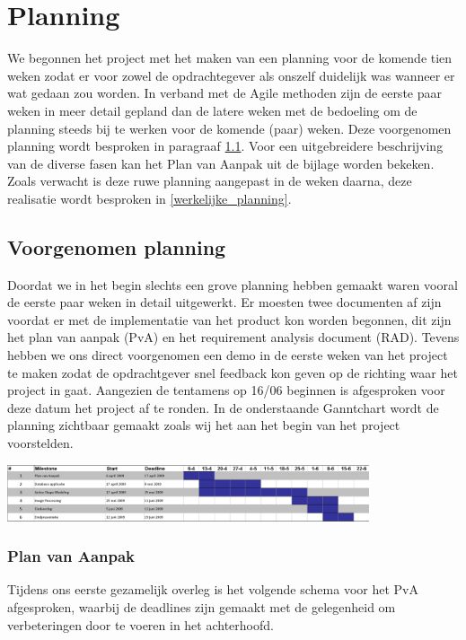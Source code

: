 \section{Planning}
\label{Planning}

We begonnen het project met het maken van een planning voor de komende tien
weken zodat er voor zowel de opdrachtegever als onszelf duidelijk was wanneer
er wat gedaan zou worden. In verband met de Agile methoden zijn de eerste paar
weken in meer detail gepland dan de latere weken met de bedoeling om de
planning steeds bij te werken voor de komende (paar) weken. Deze voorgenomen
planning wordt besproken in paragraaf \ref{voorgenomen_planning}. Voor een
uitgebreidere beschrijving van de diverse fasen kan het Plan van Aanpak uit de
bijlage worden bekeken. Zoals verwacht is deze ruwe planning aangepast in de
weken daarna, deze realisatie wordt besproken in \ref{werkelijke_planning}.

\subsection{Voorgenomen planning}
\label{voorgenomen_planning}

Doordat we in het begin slechts een grove planning hebben gemaakt waren vooral
de eerste paar weken in detail uitgewerkt. Er moesten twee documenten af zijn
voordat er met de implementatie van het product kon worden begonnen, dit zijn
het plan van aanpak (PvA) en het requirement analysis document (RAD). Tevens
hebben we ons direct voorgenomen een demo in de eerste weken van het project te
maken zodat de opdrachtgever snel feedback kon geven op de richting waar het
project in gaat.
Aangezien de tentamens op 16/06 beginnen is afgesproken
voor deze datum het project af te ronden. In de onderstaande Ganntchart wordt
de planning zichtbaar gemaakt zoals wij het aan het begin van het project
voorstelden.

\includegraphics[width=0.8\textwidth]{ganntbefore}

\subsubsection{Plan van Aanpak}

Tijdens ons eerste gezamelijk overleg is het volgende schema voor het PvA
afgesproken, waarbij de deadlines zijn gemaakt met de gelegenheid om
verbeteringen door te voeren in het achterhoofd.

